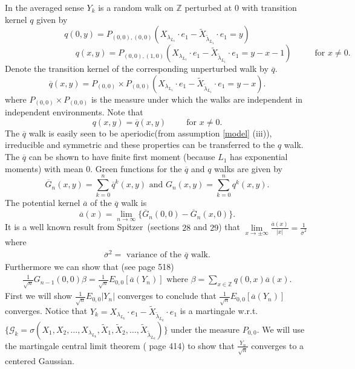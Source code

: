 \documentclass[11pt]{amsart}
\begin{document}
In the averaged sense $Y_k$ is a random walk on $\mathbb{Z}$ perturbed at $0$ with transition kernel $q$ given by
\[ q(0,y)= P_{(0,0),(0,0)} (X_{\lambda_{L_1}}\cdot e_1 - \tilde{X}_{\tilde{\lambda}_{L_1}}\cdot e_1  = y)  \]
 \[\qquad \qquad \qquad \qquad \, \, q(x,y)=P_{(0,0),(1,0)} (X_{\lambda_{L_1}}\cdot e_1 - \tilde{X}_{\tilde{\lambda}_{L_1}}\cdot e_1  = y-x-1) \hspace{1cm} \mbox{ for } x \neq 0.\]
Denote the transition kernel of the corresponding unperturbed walk by $\overline{q}$. \[\overline{q}(x,y)=P_{(0,0)}\times P_{(0,0)}(X_{\lambda_{L_1}}\cdot e_1 - \tilde{X}_{\tilde{\lambda}_{L_1}}\cdot e_1= y-x). \]
where $P_{(0,0)}\times P_{(0,0)}$ is the measure under which the walks are independent in independent environments. Note that 
\[ q(x,y)=\overline{q}(x,y) \hspace{1cm} \mbox{for } x \neq 0. \]
The $\overline{q}$ walk is easily seen to be aperiodic(from assumption \ref{model} (iii)), irreducible and symmetric and these properties can be transferred to the $q$ walk. The $\overline{q}$ can be shown to have finite first moment (because $L_1$ has exponential moments) with mean $0$. Green functions for the $\overline{q}$ and $q$ walks are given by
\[ \overline{G}_n(x,y)=\sum_{k=0}^{n}\overline{q}^k(x,y) \mbox{ and } G_n(x,y)=\sum_{k=0}^{n}q^k(x,y). \]
The potential kernel $\overline{a}$ of the $\overline{q}$ walk is
 \[ \overline{a}(x) = \lim \limits_{n \to \infty} \{ \overline{G}_n(0,0)-\overline{G}_n(x,0) \} .\]
It is a well known result from Spitzer~\cite{spitzer}(sections $28$ and $29$) that  $\lim \limits_{ x \to \pm \infty} \frac{\overline{a}(x)}{|x|}= \frac{1}{\overline{\sigma}^2}$ where
\begin{eqnarray}
\label{sigma}
\overline{\sigma}^2 = \mbox{ variance of the } \overline{q} \mbox{ walk}.
\end{eqnarray}
Furthermore we can show that (see \cite{brs} page 518)
\begin{eqnarray}
\label{beta}
 \frac{1}{\sqrt{n}} G_{n-1}(0,0) \beta = \frac{1}{\sqrt{n}} E_{0,0}[\overline{a}(Y_n)] \mbox{ where } \beta=\sum_{x \in \mathbb{Z} } q(0,x) \overline{a}(x). 
 \end{eqnarray}
First we will show $ \frac{1}{\sqrt{n}} E_{0,0}|Y_n|$  converges to conclude that $ \frac{1}{\sqrt{n}} E_{0,0}[\overline{a}(Y_n)]$  converges. Notice that $Y_k=X_{\lambda_{L_k}}\cdot e_1-\tilde{X}_{\tilde{\lambda}_{L_k}}\cdot e_1$ is a martingale w.r.t. 
$\{\mathcal{G}_k=\sigma(X_1,X_2,\dots,X_{\lambda_{L_k}},\tilde{X}_1,\tilde{X}_2,\dots,\tilde{X}_{\tilde{\lambda}_{L_k}})  \}$ under the measure $P_{0,0}$. We will use the martingale central limit theorem (\cite{durr} page 414) to show that $\frac{Y_n}{\sqrt{n}}$ converges to a centered Gaussian.
\end{document}
